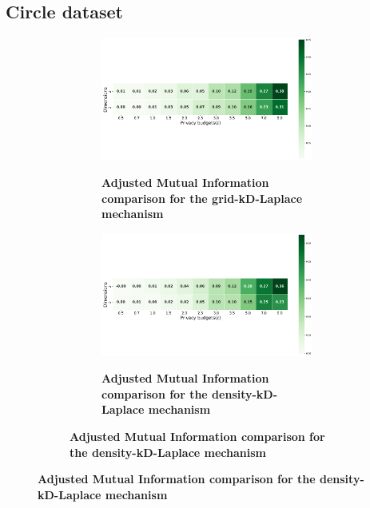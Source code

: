 \subsection{Circle dataset} \label{appendix:results-mechanism-utility-circle-dataset}
\begin{figure}[H]
    \centering
    \begin{subfigure}[b]{0.90\textwidth}
        \begin{subfigure}[c]{1\textwidth}
            \caption{\textbf{Adjusted Mutual Information comparison for the grid-kD-Laplace mechanism}}
            \includegraphics[width=1\textwidth]{Results/kd-laplace/grid-kd-Laplace/circle-dataset/ami.png}
            \label{fig:ami_circle-dataset_comparison_grid-kd_2d}
        \end{subfigure}
        \vfill %
        \begin{subfigure}[c]{1\textwidth}
            \caption{\textbf{Adjusted Mutual Information comparison for the density-kD-Laplace mechanism}}
            \includegraphics[width=1\textwidth]{Results/kd-laplace/density-kd-Laplace/circle-dataset/ami.png}
            \label{fig:ami_circle-dataset_comparison_density-kd_2d}
        \end{subfigure}
    \end{subfigure}
\end{figure}
\newpage
